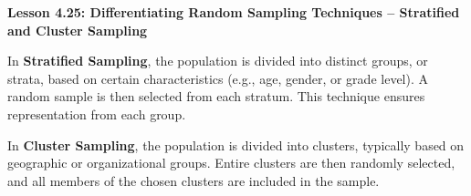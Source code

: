 \begin{center}
\textbf{Lesson 4.25: Differentiating Random Sampling Techniques -- Stratified and Cluster Sampling}
\end{center}

\vspace*{-1.5ex}

In \textbf{Stratified Sampling}, the population is divided into distinct groups, or strata, based on certain characteristics (e.g., age, gender, or grade level). A random sample is then selected from each stratum. This technique ensures representation from each group.

In \textbf{Cluster Sampling}, the population is divided into clusters, typically based on geographic or organizational groups. Entire clusters are then randomly selected, and all members of the chosen clusters are included in the sample.


